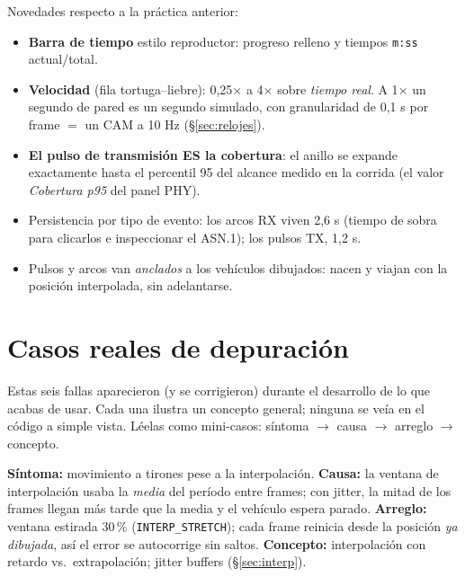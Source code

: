 \documentclass[11pt,a4paper]{article}
\begin{document}
\begin{ennavegador}
Novedades respecto a la práctica anterior:
\begin{itemize}[leftmargin=1.4em, itemsep=1pt]
  \item \textbf{Barra de tiempo} estilo reproductor: progreso relleno y
        tiempos \texttt{m:ss} actual/total.
  \item \textbf{Velocidad} (fila tortuga--liebre): 0{,}25$\times$ a 4$\times$
        sobre \emph{tiempo real}. A 1$\times$ un segundo de pared es un segundo
        simulado, con granularidad de 0{,}1 s por frame $=$ un CAM a 10 Hz
        (\S\ref{sec:relojes}).
  \item \textbf{El pulso de transmisión ES la cobertura}: el anillo se expande
        exactamente hasta el percentil 95 del alcance medido en la corrida (el
        valor \emph{Cobertura p95} del panel PHY).
  \item Persistencia por tipo de evento: los arcos RX viven 2{,}6 s (tiempo de
        sobra para clicarlos e inspeccionar el ASN.1); los pulsos TX, 1{,}2 s.
  \item Pulsos y arcos van \emph{anclados} a los vehículos dibujados: nacen y
        viajan con la posición interpolada, sin adelantarse.
\end{itemize}
\end{ennavegador}

\section{Casos reales de depuración}

Estas seis fallas aparecieron (y se corrigieron) durante el desarrollo de lo
que acabas de usar. Cada una ilustra un concepto general; ninguna se veía en
el código a simple vista. Léelas como mini-casos: síntoma $\to$ causa $\to$
arreglo $\to$ concepto.

\begin{casobox}
\textbf{Síntoma:} movimiento a tirones pese a la interpolación.
\textbf{Causa:} la ventana de interpolación usaba la \emph{media} del período
entre frames; con jitter, la mitad de los frames llegan más tarde que la media
y el vehículo espera parado. \textbf{Arreglo:} ventana estirada 30\,\%
(\texttt{INTERP\_STRETCH}); cada frame reinicia desde la posición \emph{ya
dibujada}, así el error se autocorrige sin saltos. \textbf{Concepto:}
interpolación con retardo vs.\ extrapolación; jitter buffers
(\S\ref{sec:interp}).
\end{casobox}
\end{document}
